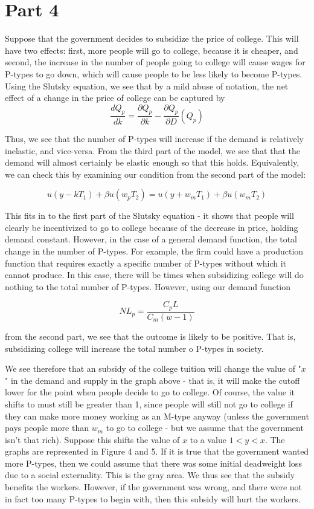 \documentclass[12pt]{article}
\newcommand{\qpartial}[2]{\dfrac{\partial #1}{\partial #2}}
\begin{document}
\begin{enumerate}
\begin{enumerate}
\end{enumerate}

\section*{Part 4}

Suppose that the government decides to subsidize the price of college.  This will have two effects: first, more people will go to college, because it is cheaper, and second, the increase in the number of people going to college will cause wages for P-types to go down, which will cause people to be less likely to become P-types.  Using the Slutsky equation, we see that by a mild abuse of notation, the net effect of a change in the price of college can be captured by 
$$
\dfrac{dQ_p}{dk} = \qpartial{Q_p}{k} - \qpartial{Q_p}{D}(Q_p)
$$

Thus, we see that the number of P-types will increase if the demand is relatively inelastic, and vice-versa.  From the third part of the model, we see that that the demand will almost certainly be elastic enough so that this holds.  Equivalently, we can check this by examining our condition from the second part of the model:

$$
u(y - k T_1) + \beta u(w_p T_2) = u(y + w_m T_1) + \beta u(w_m T_2)
$$

This fits in to the first part of the Slutsky equation - it shows that people will clearly be incentivized to go to college because of the decrease in price, holding demand constant.  However, in the case of a general demand function, the total change in the number of P-types.  For example, the firm could have a production function that requires exactly a specific number of P-types without which it cannot produce.  In this case, there will be times when subsidizing college will do nothing to the total number of P-types.  However, using our demand function

$$
NL_p = \frac{C_p L}{C_m(w - 1)}
$$

from the second part, we see that the outcome is likely to be positive.  That is, subsidizing college will increase the total number o P-types in society.  

We see therefore that an subsidy of the college tuition will change the value of "$x$" in the demand and supply in the graph above - that is, it will make the cutoff lower for the point when people decide to go to college.  Of course, the value it shifts to must still be greater than 1, since people will still not go to college if they can make more money working as an M-type anyway (unless the government pays people more than $w_m$ to go to college - but we assume that the government isn't that rich).  Suppose this shifts the value of $x$ to a value $1 < y < x$.  The graphs are represented in Figure 4 and 5.  If it is true that the government wanted more P-types, then we could assume that there was some initial deadweight loss due to a social externality.  This is the gray area.  We thus see that the subsidy benefits the workers.  However, if the government was wrong, and there were not in fact too many P-types to begin with, then this subsidy will hurt the workers. 




\end{enumerate}
\end{document}
